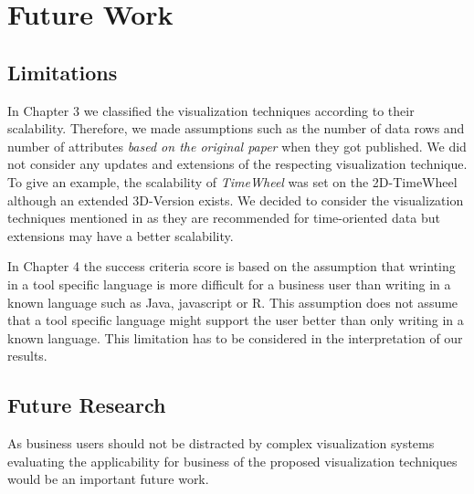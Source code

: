 \chapter{Future Work}
\label{Future Work}

\section{Limitations}
In Chapter 3 we classified the visualization techniques according to their scalability. Therefore, we made assumptions such as the number of data rows and number of attributes \textit{based on the original paper} when they got published. We did not consider any updates and extensions of the respecting visualization technique. To give an example, the scalability of \textit{TimeWheel} was set on the 2D-TimeWheel although an extended 3D-Version exists. We decided to consider the visualization techniques mentioned in\cite{Aigner2011} as they are recommended for time-oriented data but extensions may have a better scalability.  

In Chapter 4 the success criteria score is based on the assumption that wrinting in a tool specific language is more difficult for a business user than writing in a known language such as Java, javascript or R. This assumption does not assume that a tool specific language might support the user better than only writing in a known language. This limitation has to be considered in the interpretation of our results.
\section{Future Research}


As business users should not be distracted by complex visualization systems \cite{Tegarden1999} evaluating the applicability for business of the proposed visualization techniques would be an important future work.
